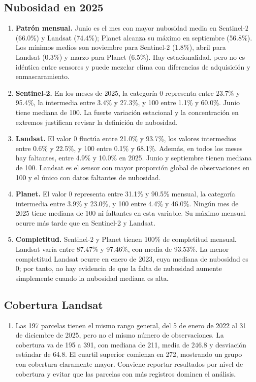 ﻿\documentclass[11pt,a4paper]{article}
\begin{document}
\subsection{Nubosidad en 2025}
\begin{enumerate}
  \item \textbf{Patrón mensual.} Junio es el mes con mayor nubosidad media en
  Sentinel-2 (66.0\%) y Landsat (74.4\%); Planet alcanza su máximo en septiembre
  (56.8\%). Los mínimos medios son noviembre para Sentinel-2 (1.8\%), abril para
  Landsat (0.3\%) y marzo para Planet (6.5\%). Hay estacionalidad, pero no es
  idéntica entre sensores y puede mezclar clima con diferencias de adquisición
  y enmascaramiento.

  \item \textbf{Sentinel-2.} En los meses de 2025, la categoría 0 representa
  entre 23.7\% y 95.4\%, la intermedia entre 3.4\% y 27.3\%, y 100 entre 1.1\%
  y 60.0\%. Junio tiene mediana de 100. La fuerte variación estacional y la
  concentración en extremos justifican revisar la definición de nubosidad.

  \item \textbf{Landsat.} El valor 0 fluctúa entre 21.0\% y 93.7\%, los valores
  intermedios entre 0.6\% y 22.5\%, y 100 entre 0.1\% y 68.1\%. Además, en todos
  los meses hay faltantes, entre 4.9\% y 10.0\% en 2025. Junio y septiembre
  tienen mediana de 100. Landsat es el sensor con mayor proporción global de
  observaciones en 100 y el único con datos faltantes de nubosidad.

  \item \textbf{Planet.} El valor 0 representa entre 31.1\% y 90.5\% mensual,
  la categoría intermedia entre 3.9\% y 23.0\%, y 100 entre 4.4\% y 46.0\%.
  Ningún mes de 2025 tiene mediana de 100 ni faltantes en esta variable. Su
  máximo mensual ocurre más tarde que en Sentinel-2 y Landsat.

  \item \textbf{Completitud.} Sentinel-2 y Planet tienen 100\% de completitud
  mensual. Landsat varía entre 87.47\% y 97.46\%, con media de 93.53\%. La menor
  completitud Landsat ocurre en enero de 2023, cuya mediana de nubosidad es 0;
  por tanto, no hay evidencia de que la falta de nubosidad aumente simplemente
  cuando la nubosidad mediana es alta.
\end{enumerate}

\subsection{Cobertura Landsat}
\begin{enumerate}[resume]
  \item Las 197 parcelas tienen el mismo rango general, del 5 de enero de 2022
  al 31 de diciembre de 2025, pero no el mismo número de observaciones. La
  cobertura va de 195 a 391, con mediana de 211, media de 246.8 y desviación
  estándar de 64.8. El cuartil superior comienza en 272, mostrando un grupo con
  cobertura claramente mayor. Conviene reportar resultados por nivel de
  cobertura y evitar que las parcelas con más registros dominen el análisis.
\end{enumerate}
\end{document}
